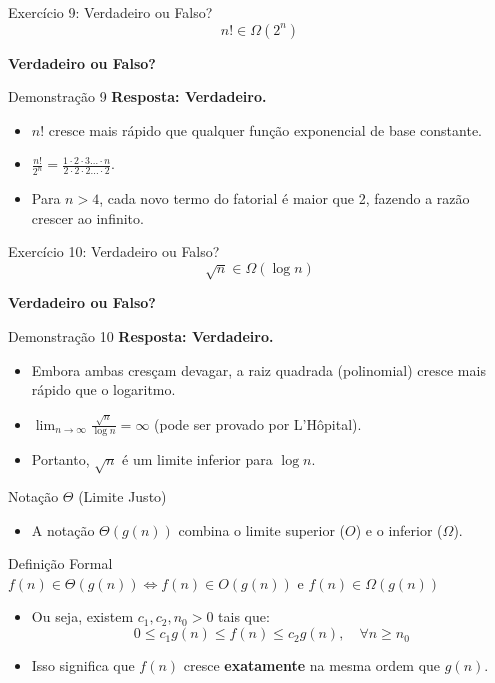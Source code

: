 \documentclass[aspectratio=169]{beamer}
\begin{document}
\begin{frame}{Exercício 9: Verdadeiro ou Falso?}
    \Large
    \[ n! \in \Omega(2^n) \]
    \begin{center}
        \textbf{Verdadeiro ou Falso?}
    \end{center}
\end{frame}

\begin{frame}{Demonstração 9}
    \textbf{Resposta: Verdadeiro.}
    \begin{itemize}
        \item $n!$ cresce mais rápido que qualquer função exponencial de base constante.
        \item $\frac{n!}{2^n} = \frac{1 \cdot 2 \cdot 3 \dots \cdot n}{2 \cdot 2 \cdot 2 \dots \cdot 2}$.
        \item Para $n > 4$, cada novo termo do fatorial é maior que 2, fazendo a razão crescer ao infinito.
    \end{itemize}
\end{frame}

\begin{frame}{Exercício 10: Verdadeiro ou Falso?}
    \Large
    \[ \sqrt{n} \in \Omega(\log n) \]
    \begin{center}
        \textbf{Verdadeiro ou Falso?}
    \end{center}
\end{frame}

\begin{frame}{Demonstração 10}
    \textbf{Resposta: Verdadeiro.}
    \begin{itemize}
        \item Embora ambas cresçam devagar, a raiz quadrada (polinomial) cresce mais rápido que o logaritmo.
        \item $\lim_{n \to \infty} \frac{\sqrt{n}}{\log n} = \infty$ (pode ser provado por L'Hôpital).
        \item Portanto, $\sqrt{n}$ é um limite inferior para $\log n$.
    \end{itemize}
\end{frame}

\begin{frame}{Notação $\Theta$ (Limite Justo)}
    \begin{itemize}
        \item A notação $\Theta(g(n))$ combina o limite superior ($O$) e o inferior ($\Omega$).
    \end{itemize}
    
    \begin{block}{Definição Formal}
        $f(n) \in \Theta(g(n)) \iff f(n) \in O(g(n)) \text{ e } f(n) \in \Omega(g(n))$
    \end{block}
    
    \begin{itemize}
        \item Ou seja, existem $c_1, c_2, n_0 > 0$ tais que:
        \[ 0 \le c_1 g(n) \le f(n) \le c_2 g(n), \quad \forall n \ge n_0 \]
        \item Isso significa que $f(n)$ cresce \textbf{exatamente} na mesma ordem que $g(n)$.
    \end{itemize}
\end{frame}
\end{document}
